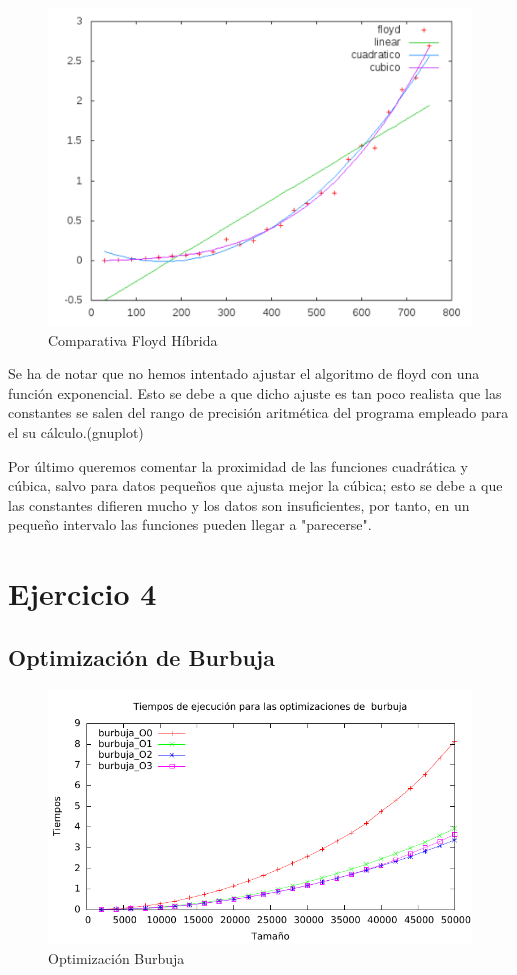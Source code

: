 \documentclass[a4paper, 11pt]{article}
\begin{document}
\begin{figure}[H]\includegraphics[width=13cm]{img/floyd_hibrida.pdf} \centering
	\caption{Comparativa Floyd Híbrida}\end{figure}

\begin{framed}
	Se ha de notar que no hemos intentado ajustar el algoritmo de floyd con una función exponencial. Esto se debe a que dicho ajuste es tan poco realista que las constantes se salen del rango de precisión aritmética del programa empleado para el su cálculo.(gnuplot)
\end{framed}


Por último queremos comentar la proximidad de las funciones cuadrática y cúbica, salvo para datos pequeños que ajusta mejor la cúbica; esto se debe a que las constantes difieren mucho y los datos son insuficientes, por tanto, en un pequeño intervalo las funciones pueden llegar a "parecerse".

\newpage
\section{Ejercicio 4}
\subsection{Optimización de Burbuja}

\begin{figure}[H]\includegraphics[width=13cm]{img/burbuja_optim_g.pdf} \centering
	\caption{Optimización Burbuja}\end{figure}
\end{document}
